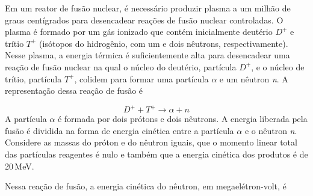 Em um reator de fusão nuclear, é necessário produzir plasma a um milhão de graus centígrados para desencadear reações de fusão nuclear controladas. O plasma é formado por um gás ionizado que contém inicialmente deutério $D^{+}$ e trítio $T^{+}$ (isótopos do hidrogênio, com um e dois nêutrons, respectivamente). Nesse plasma, a energia térmica é suficientemente alta para desencadear uma reação de fusão nuclear na qual o núcleo do deutério, partícula $D^{+}$, e o núcleo de trítio, partícula $T^{+}$, colidem para formar uma partícula $\alpha$ e um nêutron \textit{n}. A representação dessa reação de fusão é\par
\[ D^{+} + T^{+} \longrightarrow \alpha + n \]
A partícula $\alpha$ é formada por dois prótons e dois nêutrons. A energia liberada pela fusão é dividida na forma de energia cinética entre a partícula $\alpha$ e o nêutron \textit{n}. Considere as massas do próton e do nêutron iguais, que o momento linear total das partículas reagentes é nulo e também que a energia cinética dos produtos é de 20\,MeV.\par
{}
Nessa reação de fusão, a energia cinética do nêutron, em megaelétron-volt, é\par
\begin{altlinha}
%
%
%
%
\end{altlinha}
